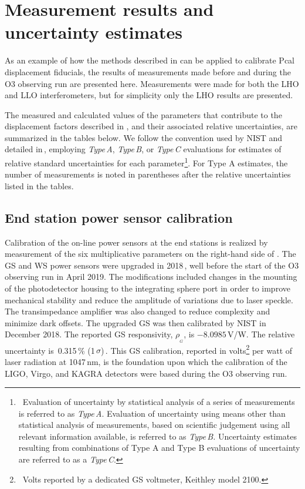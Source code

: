 \documentclass[12pt,a4paper,final]{iopart}
\begin{document}
\section{Measurement results and uncertainty estimates}
\label{sec:results}
%
As an example of how the methods described in  can be applied to calibrate Pcal displacement fiducials, the results of measurements made before and during the O3 observing run are presented here.  Measurements were made for both the LHO and LLO interferometers, but for simplicity only the LHO results are presented.

The measured and calculated values of the parameters that contribute to the displacement factors described in , and their associated relative uncertainties, are summarized in the tables below. We follow the convention used by NIST and detailed in\,\cite{NIST-1297}, employing {\em Type\,A}, {\em Type\,B}, or {\em Type\,C} evaluations for estimates of relative standard uncertainties for each parameter\footnote{ \ Evaluation of uncertainty by statistical analysis of a series of measurements is referred to as  {\em Type\,A}. Evaluation of uncertainty using means other than statistical analysis of measurements, based on scientific judgement using all relevant information available, is referred to as  {\em Type\,B.} Uncertainty estimates resulting from combinations of Type A and Type B evaluations of uncertainty are referred to as a {\em Type\,C}.}. For Type A estimates, the number of measurements is noted in parentheses after the relative uncertainties listed in the tables.
%
\subsection{End station power sensor calibration}
\label{subsec:ResultSensecal}
%
Calibration of the on-line power sensors at the end stations is realized by measurement of the six multiplicative parameters on the right-hand side of .  The GS and WS power sensors were upgraded in 2018\,\cite{ws_change}, well before the start of the O3 observing run in April 2019.  The modifications included changes in the mounting of the photodetector housing to the integrating sphere port in order to improve mechanical stability and reduce the amplitude of variations due to laser speckle.  The transimpedance amplifier was also changed to reduce complexity and minimize dark offsets.   The upgraded GS was then calibrated by NIST in December 2018.
The reported GS responsivity, $\rho_{_{G}}$, is $-8.0985$\,V/W.  
The relative uncertainty is\, 0.315\,\% (1\,$\sigma$)\,\cite{T1900097}.  This GS calibration,  reported in volts\footnote{ \ Volts reported by a dedicated GS voltmeter, Keithley model 2100.} per watt of laser radiation at 1047\,nm, is the foundation upon which the calibration of the LIGO, Virgo, and KAGRA detectors were based during the O3 observing run.
\end{document}
